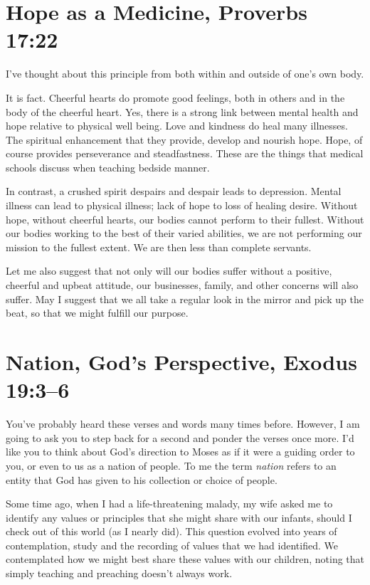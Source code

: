 \documentclass[12pt]{memoir}
\begin{document}
\section[Hope as a Medicine]{Hope as a Medicine, Proverbs 17:22}
 

I've thought about this principle from both within and outside of one's own body.

It is fact. Cheerful hearts do promote good feelings, both in others
and in the body of the cheerful heart. Yes, there is a strong link
between mental health and hope relative to physical well being. Love and kindness do heal many illnesses. The spiritual enhancement that they
provide, develop and nourish hope. Hope, of course provides perseverance
and steadfastness. These are the things that medical schools discuss
when teaching bedside manner.

In contrast, a crushed spirit despairs and despair leads to depression. Mental illness can lead to physical illness; lack of hope to loss of healing desire. Without hope, without
cheerful hearts, our bodies cannot perform to their fullest. Without
our bodies working to the best of their varied abilities, we are not
performing our mission to the fullest extent. We are then less than
complete servants.

Let me also suggest that not only will our bodies suffer without a
positive, cheerful and upbeat attitude, our businesses, family, and
other concerns will also suffer. May I suggest that we all take a regular look in the mirror and pick up the beat, so that
we might fulfill our purpose.

\section[Nation, God's Perspective]{Nation, God's Perspective, Exodus 19:3--6}
 

You've probably heard these verses and words many times before. However,
I am going to ask you to step back for a second and ponder the verses
once more. I'd like you to think about God's direction to Moses as
if it were a guiding order to you, or even to us as a nation
of people. To me the term \emph{nation} refers to an entity that God has given to his collection or choice of people. 

Some time ago, when I had a life-threatening malady, my wife asked
me to identify any values or principles that she might share with
our infants, should I check out of this world (as I nearly did).
This question evolved into years of contemplation, study and the recording
of values that we had identified. We contemplated how we might best
share these values with our children, noting that simply teaching
and preaching doesn't always work.
\end{document}

